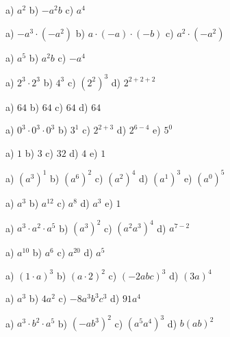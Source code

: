 {\begin{tehtava}
\begin{vastaus}
a) $a^2$ \qquad b) $-a^2b$ \qquad c) $a^4$
\end{vastaus}
\end{tehtava}
\begin{tehtava}
a) $-a^3\cdot(-a^2)$ \qquad b) $a\cdot(-a)\cdot(-b)$ \qquad c) $a^2\cdot(-a^2)$
\begin{vastaus}
a) $a^5$ \qquad b) $a^2b$ \qquad c) $-a^4$
\end{vastaus}
\end{tehtava}
\begin{tehtava}
a) $2^3\cdot2^3$ \qquad b) $4^3$ \qquad c) $(2^2)^3$ \qquad d) $2^{2+2+2}$
\begin{vastaus}
a) $64$ \qquad b) $64$ \qquad c) $64$ \qquad d) $64$
\end{vastaus}
\end{tehtava}
\begin{tehtava}
a) $0^3\cdot0^3\cdot0^3$ \qquad b) $3^1$ \qquad c) $2^{2+3}$ \qquad d) $2^{6-4}$ \qquad e) $5^0$
\begin{vastaus}
a) $1$ \qquad b) $3$ \qquad c) $32$ \qquad d) $4$ \qquad e) $1$
\end{vastaus}
\end{tehtava}
\begin{tehtava}
a) $(a^3)^1$ \qquad b) $(a^6)^2$ \qquad c) $(a^2)^4$ \qquad d) $(a^1)^3$ \qquad e) $(a^0)^5$
\begin{vastaus}
a) $a^3$ \qquad b) $a^{12}$ \qquad c) $a^8$ \qquad d) $a^3$ \qquad e) $1$
\end{vastaus}
\end{tehtava}
\begin{tehtava}
a) $a^3\cdot a^2\cdot a^5$ \qquad b) $(a^3)^2$ \qquad c) $(a^2a^3)^4$ \qquad d) $a^{7-2}$
\begin{vastaus}
a) $a^{10}$ \qquad b) $a^6$ \qquad c) $a^{20}$ \qquad d) $a^5$
\end{vastaus}
\end{tehtava}
\begin{tehtava}
a) $(1\cdot a)^3$ \qquad b) $(a\cdot 2)^2$ \qquad c) $(-2abc)^3$ \qquad d) $(3a)^4$
\begin{vastaus}
a) $a^3$ \qquad b) $4a^2$ \qquad c) $-8a^3b^3c^3$ \qquad d) $91a^4$
\end{vastaus}
\end{tehtava}
\begin{tehtava}
a) $a^3\cdot b^2\cdot a^5$ \qquad b) $(-ab^3)^2$ \qquad c) $(a^5a^4)^3$ \qquad d) $b(ab)^2$

\end{tehtava}}
